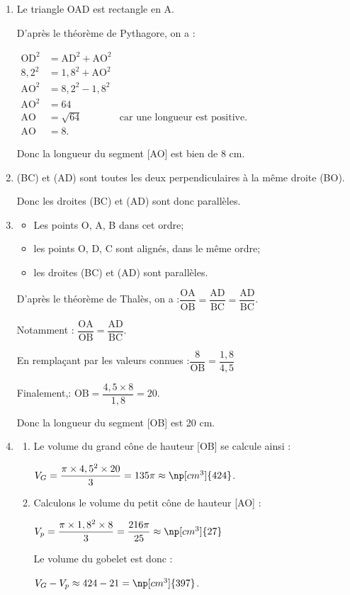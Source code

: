 \documentclass[12pt,a4paper,french]{article}
\begin{document}
\begin{enumerate}
	\item Le triangle OAD est rectangle en A.

	D'après le théorème de Pythagore, on a :

	$\begin{aligned}
	\mathrm{OD}^2&=\mathrm{AD}^2+\mathrm{AO}^2\\
	8,2^2&=1,8^2+\mathrm{AO}^2\\
	\mathrm{AO}^2&=8,2^2-1,8^2\\
	\mathrm{AO}^2&=64\\
	\mathrm{AO}&=\sqrt{64}& \text{car une longueur est positive.}\\
	\mathrm{AO}&=8.
	\end{aligned}$

	Donc la longueur du segment [AO] est bien de 8 cm.

	\item (BC) et (AD) sont toutes les deux perpendiculaires à la même droite (BO).

	Donc les droites (BC) et (AD) sont donc parallèles.

	\item \begin{itemize}
		\item Les points O, A, B dans cet ordre;
		\item les points O, D, C sont alignés, dans le même ordre;
		\item les droites (BC) et (AD) sont parallèles.
	\end{itemize}

	D'après le théorème de Thalès, on a :\quad $\dfrac{\mathrm{OA}}{\mathrm{OB}}=\dfrac{\mathrm{AD}}{\mathrm{BC}}=\dfrac{\mathrm{AD}}{\mathrm{BC}}$.

	Notamment : \quad $\dfrac{\mathrm{OA}}{\mathrm{OB}}=\dfrac{\mathrm{AD}}{\mathrm{BC}}$.

	En remplaçant par les valeurs connues :\quad $\dfrac{8}{\mathrm{OB}}=\dfrac{1,8}{4,5}$

	Finalement,\quad : $\mathrm{OB}=\dfrac{4,5\times 8}{1,8} =20$.

	Donc la longueur du segment [OB] est 20 cm.

	\item \begin{enumerate}
		\item Le volume du grand cône de hauteur [OB] se calcule ainsi :

		$V_G=\dfrac{\pi \times 4,5^2\times 20}{3}=135\pi\approx \np[cm^3]{424}$.

		\item Calculons le volume du petit cône de hauteur [AO] :

		$V_p=\dfrac{\pi \times 1,8^2\times 8}{3}=\dfrac{216\pi}{25}\approx \np[cm^3]{27}$

		Le volume du gobelet est donc :

		$V_G-V_p\approx 424-21=\np[cm^3]{397}$.
	\end{enumerate}
\end{enumerate}
\end{document}
